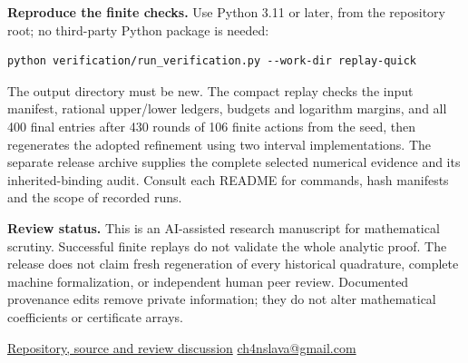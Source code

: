 \documentclass[10pt]{article}
\begin{document}
\textbf{Reproduce the finite checks.} Use Python 3.11 or later, from the
repository root; no third-party Python package is needed:
\begin{verbatim}
python verification/run_verification.py --work-dir replay-quick
\end{verbatim}
The output directory must be new. The compact replay checks the input
manifest, rational upper/lower ledgers, budgets and logarithm margins,
and all 400 final entries after 430 rounds of 106 finite actions from the
seed, then regenerates the adopted refinement using two interval
implementations. The separate release archive supplies the complete selected
numerical evidence and its inherited-binding audit. Consult each README
for commands, hash manifests and the scope of recorded runs.

\textbf{Review status.} This is an AI-assisted research manuscript for
mathematical scrutiny. Successful finite replays do not validate the whole
analytic proof. The release does not claim fresh regeneration of every
historical quadrature, complete machine formalization, or independent
human peer review. Documented provenance edits remove private information;
they do not alter mathematical coefficients or certificate arrays.

\vfill
\small
\href{https://github.com/UyNewNas/chen-imbalanced-semiprimes}{Repository, source and review discussion}
\hfill\href{mailto:ch4nslava@gmail.com}{ch4nslava@gmail.com}
\end{document}
